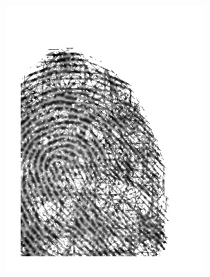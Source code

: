 \documentclass{beamer}
\begin{document}
{\begin{figure}[!ht]
\begin{subfigure}[ht]{0.15\textwidth}
            \includegraphics[width=\textwidth]{fingerprints/2004Db4a/1_1_filtered.jpg}
        \end{subfigure}
    \end{figure}
    \begin{figure}[!ht]
        \centering
        \begin{subfigure}[ht]{0.15\textwidth}

\end{subfigure}
\end{figure}}
\end{document}
